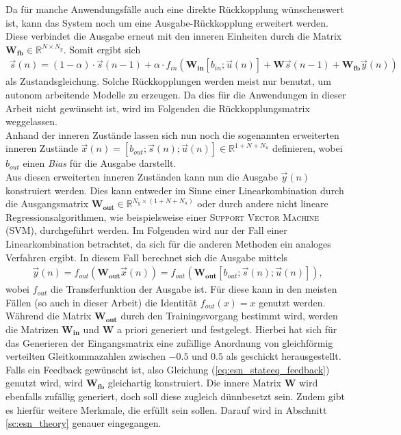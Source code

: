 Da für manche Anwendungsfälle auch eine direkte Rückkopplung wünschenswert ist, kann das System noch um eine Ausgabe-Rückkopplung erweitert werden. Diese verbindet die Ausgabe erneut mit den inneren Einheiten durch die Matrix $\mathbf{W_{fb}} \in \mathbb{R}^{N \times N_y}$.
Somit ergibt sich 
\begin{align}
\label{eq:esn_stateeq_feedback}
\vec{s}(n) = (1 - \alpha) \cdot \vec{s}(n-1) + \alpha \cdot f_{in}\left( \mathbf{W_{in}} [b_{in}; \vec{u}(n)] + \mathbf{W} \vec{s}(n-1) + \mathbf{W_{fb}} \vec{y}(n) \right)
\end{align}
als Zustandsgleichung. Solche Rückkopplungen werden meist nur benutzt, um autonom arbeitende Modelle zu erzeugen. Da dies für die Anwendungen in dieser Arbeit nicht gewünscht ist, wird im Folgenden die Rückkopplungsmatrix weggelassen.\\

Anhand der inneren Zustände lassen sich nun noch die sogenannten erweiterten inneren Zustände $\vec{x}(n) = [b_{out}; \vec{s}(n); \vec{u}(n)] \in \mathbb{R}^{1 + N + N_u}$ definieren, wobei $b_{out}$ einen \textit{Bias} für die Ausgabe darstellt.\\

Aus diesen erweiterten inneren Zuständen kann nun die Ausgabe $\vec{y}(n)$ konstruiert werden. Dies kann entweder im Sinne einer Linearkombination durch die Ausgangsmatrix $\mathbf{W_{out}} \in \mathbb{R}^{ N_y \times (1 + N + N_u)}$ oder durch andere nicht lineare Regressionsalgorithmen, wie beispielsweise einer \textsc{Support Vector Machine (SVM)}, durchgeführt werden. Im Folgenden wird nur der Fall einer Linearkombination betrachtet, da sich für die anderen Methoden ein analoges Verfahren ergibt.
In diesem Fall berechnet sich die Ausgabe mittels
\begin{align}
\vec{y}(n) = f_{out} \left( \mathbf{W_{out}} \vec{x}(n) \right) = f_{out} \left(\mathbf{W_{out}} [b_{out}; \vec{s}(n); \vec{u}(n)] \right),
\end{align}
wobei $f_{out}$ die Transferfunktion der Ausgabe ist. Für diese kann in den meisten Fällen (so auch in dieser Arbeit) die Identität $f_{out}(x) = x$ genutzt werden.\\

Während die Matrix $\mathbf{W_{out}}$ durch den Trainingsvorgang bestimmt wird, werden die Matrizen $\mathbf{W_{in}}$ und $\mathbf{W}$ a priori generiert und festgelegt. Hierbei hat sich für das Generieren der Eingangsmatrix eine zufällige Anordnung von gleichförmig verteilten Gleitkommazahlen zwischen $-0.5$ und $0.5$ als geschickt herausgestellt. Falls ein Feedback gewünscht ist, also Gleichung (\ref{eq:esn_stateeq_feedback}) genutzt wird, wird $\mathbf{W_{fb}}$ gleichartig konstruiert. Die innere Matrix $\mathbf{W}$ wird ebenfalls zufällig generiert, doch soll diese zugleich dünnbesetzt sein. Zudem gibt es hierfür weitere Merkmale, die erfüllt sein sollen. Darauf wird in Abschnitt \ref{sc:esn_theory} genauer eingegangen.

